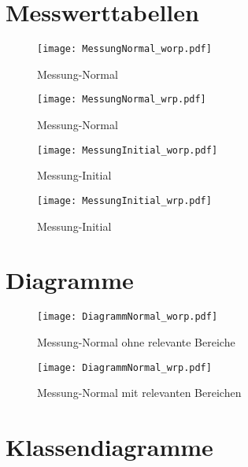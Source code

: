 \section{Messwerttabellen}

\label{sec:messtabellen}

\begin{figure}[H]
	\texttt{[image: MessungNormal\_worp.pdf]}
	\caption{Messung-Normal}	
	\label{fig:messung_normal_worp}
\end{figure}

\newpage

\begin{figure}[H]
	\texttt{[image: MessungNormal\_wrp.pdf]}
	\caption{Messung-Normal}
	\label{fig:messung_normal_wrp}	
\end{figure}

\newpage

\begin{figure}[H]
	\texttt{[image: MessungInitial\_worp.pdf]}
	\caption{Messung-Initial}	
\end{figure}

\newpage

\begin{figure}[H]
	\texttt{[image: MessungInitial\_wrp.pdf]}
	\caption{Messung-Initial}	
\end{figure}

\section{Diagramme}
\label{sec:Diagramme}

\begin{figure}[H]
	\centering
	\texttt{[image: DiagrammNormal\_worp.pdf]}
	\caption{Messung-Normal ohne relevante Bereiche}
	\label{fig:diagrammNormal_worp}
\end{figure}

\begin{figure}[H]
	\centering
	\texttt{[image: DiagrammNormal\_wrp.pdf]}
	\caption{Messung-Normal mit relevanten Bereichen}
	\label{fig:diagrammNormal_wrp}
\end{figure}

\section{Klassendiagramme}
\label{sec:klassendiagramme}

